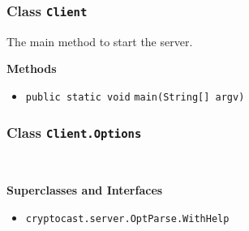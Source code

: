 \subsubsection{Class \lstinline|Client|}
The main method to start the server. \\
\noindent\begin{minipage}[t]{5cm}
\vspace{0.3em}
\hspace*{2em}
\vspace{0.3em}
\end{minipage}





\textbf{\sffamily Methods}
\begin{itemize}
\item \lstinline|public static void| \lstinline|main|\lstinline|(String[] argv)| \\[-0.6em]




\end{itemize}

\subsubsection{Class \lstinline|Client.Options|}
 \\
\noindent\begin{minipage}[t]{5cm}
\vspace{0.3em}
\hspace*{2em}
\vspace{0.3em}
\end{minipage}



\textbf{\sffamily Superclasses and Interfaces}
\begin{itemize}
\item \lstinline|cryptocast.server.OptParse.WithHelp|
\end{itemize}



